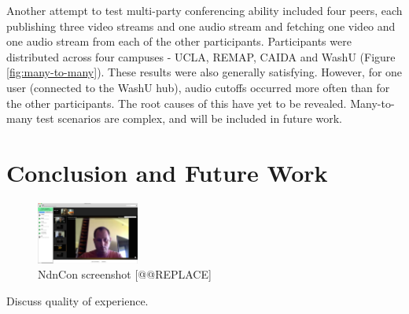 \documentclass{icn/sig-alternate-2012} %
\newcommand{\ndnconName}{NdnCon}
\begin{document}
Another attempt to test multi-party conferencing ability included four peers, each publishing three video streams and one audio stream and fetching one video and one audio stream from each of the other participants. Participants were distributed across four campuses - UCLA, REMAP, CAIDA and WashU (Figure \ref{fig:many-to-many}). These results were also generally satisfying. However, for one user (connected to the WashU hub), audio cutoffs occurred more often than for the other participants. The root causes of this have yet to be revealed. Many-to-many test scenarios are complex, and will be included in future work.

\section{Conclusion and Future Work}
\label{sec:conclusion}

\begin{figure}[t!]
\centering
\includegraphics[width=0.3\textwidth]{ndncon}
\caption{\ndnconName{} screenshot [@@REPLACE]}
\label{fig:ndncon}
\end{figure}


Discuss quality of experience. 
\end{document}

